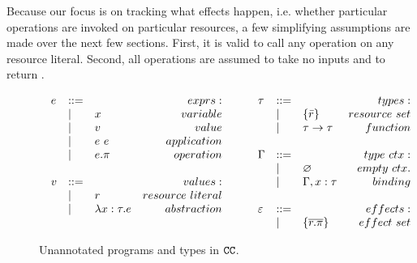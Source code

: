 Because our focus is on tracking what effects happen, i.e. whether
particular operations are invoked on particular resources, a few simplifying
assumptions are made over the next few sections. First, it is valid to call
any operation on any resource literal. Second, all operations are assumed
to take no inputs and to return .

\begin{figure}

\vspace{-0.6cm}
\[
\begin{array}{lll}
\begin{array}{lllr}
e & ::= & ~ & exprs: \\
	& | & x & variable \\
	& | & v & value \\
	& | & e ~ e & application \\
	& | & e.\pi & operation \\
	&&\\

v & ::= & ~ & values: \\
	& | & r & resource~literal \\
	& | & \lambda x: \tau.e & abstraction \\
	&&\\
\end{array}

\hspace{5ex}

\begin{array}{lllr}
\tau & ::= & ~ & types: \\
		& | & \{ \bar r \} & resource~set \\
		& | & \tau \rightarrow \tau & function\\ 
		&&\\

\Gamma & ::= & ~ & type~ctx: \\
				& | & \varnothing & empty~ctx.\\
				& | & \Gamma, x: \tau & binding\\
				&&\\
				
\varepsilon & ::= & ~ & effects: \\
		& | & \{ \overline{r.\pi} \} & effect~set \\
\end{array}
\end{array}
\]
\vspace{-0.6cm}
\caption{Unannotated programs and types in $\mathtt{CC}$.}
\vspace{-0.6cm}
\label{fig:epscalc_unannotated_grammar}
\end{figure}


